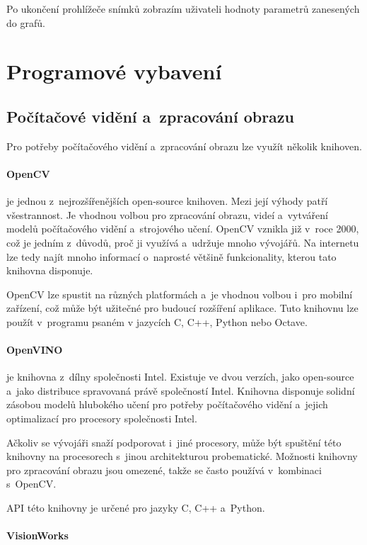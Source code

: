 Po ukončení prohlížeče snímků zobrazím uživateli hodnoty parametrů zanesených do grafů.

\section{Programové vybavení}

\subsection{Počítačové vidění a~zpracování obrazu}

Pro potřeby počítačového vidění a~zpracování obrazu lze využít několik knihoven.

\paragraph{OpenCV}

 \citep{OpenCV} je jednou z~nejrozšířenějších open-source knihoven. Mezi její výhody patří všestrannost. Je vhodnou volbou pro zpracování obrazu, videí a~vytváření modelů počítačového vidění a~strojového učení. OpenCV vznikla již v~roce 2000, což je jedním z~důvodů, proč ji využívá a~udržuje mnoho vývojářů. Na internetu lze tedy najít mnoho informací o~naprosté většině funkcionality, kterou tato knihovna disponuje.

OpenCV lze spustit na různých platformách a~je vhodnou volbou i~pro mobilní zařízení, což může být užitečné pro budoucí rozšíření aplikace. Tuto knihovnu lze použít v~programu psaném v jazycích C, C++, Python nebo Octave.

\paragraph{OpenVINO}

je knihovna z~dílny společnosti Intel. Existuje ve dvou verzích, jako open-source a~jako distribuce spravovaná právě společností Intel. Knihovna disponuje solidní zásobou modelů hlubokého učení pro potřeby počítačového vidění a~jejich optimalizací pro procesory společnosti Intel.

Ačkoliv se vývojáři snaží podporovat i~jiné procesory, může být spuštění této knihovny na procesorech s~jinou architekturou probematické. Možnosti knihovny pro zpracování obrazu jsou omezené, takže se často používá v~kombinaci s~OpenCV.

API této knihovny je určené pro jazyky C, C++ a~Python.

\paragraph{VisionWorks}

